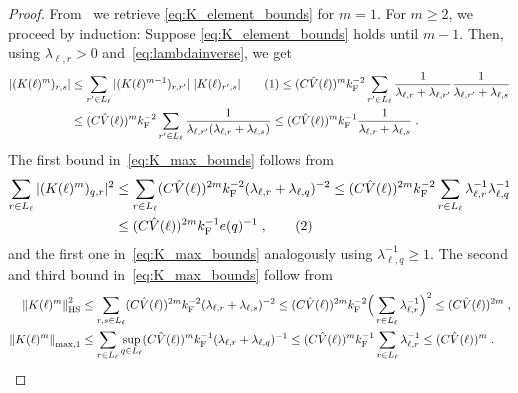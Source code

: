 \documentclass[12pt,a4paper]{article}
\numberwithin{equation}{section}
\newcommand{\1}{\mathbb{I}}
\newcommand{\F}{\mathrm{F}}
\newcommand{\HS}{\mathrm{HS}}
\newcommand{\tagg}[1]{ \stepcounter{equation} \tag{\theequation}
\label{#1} } %
\newcommand{\normmaxi}[1]{\norm{#1}_{\mathrm{max,1}}}
\theoremstyle{plain}
\theoremstyle{definition}
\theoremstyle{remark}
\theoremstyle{plain}
\theoremstyle{definition}
\theoremstyle{remark}
\begin{document}
\begin{proof}
From~\cite[Prop.~7.10]{CHN23} we retrieve \eqref{eq:K_element_bounds} for $ m = 1 $. For $ m \ge 2 $, we proceed by induction: Suppose \eqref{eq:K_element_bounds} holds until $ m-1 $. Then, using $ \lambda_{\ell,r} > 0 $ and~\eqref{eq:lambdainverse}, we get
\begin{align*}
		|(K(\ell)^m)_{r,s}|
		&\le \sum_{r' \in L_\ell}
		|(K(\ell)^{m-1})_{r,r'}| \;
		|K(\ell)_{r',s}| \tagg{eq:notimportant1}
		\le (C \hat{V}(\ell))^m k_{\F}^{-2} \sum_{r' \in L_\ell}
		\frac{1}{\lambda_{\ell, r} + \lambda_{\ell, r'}}
		\frac{1}{\lambda_{\ell, r'} + \lambda_{\ell, s}} \\
		&\le (C \hat{V}(\ell))^m k_{\F}^{-2} \sum_{r' \in L_\ell}
		\frac{1}{\lambda_{\ell, r'} (\lambda_{\ell, r} + \lambda_{\ell, s})}
		\le (C \hat{V}(\ell))^m k_{\F}^{-1}
		\frac{1}{\lambda_{\ell, r} + \lambda_{\ell, s}} \;.
\end{align*}
The first bound in~\eqref{eq:K_max_bounds} follows from
\begin{align*}
	\sum_{r \in L_\ell} |(K(\ell)^m)_{q,r}|^2
	&\le \sum_{r \in L_\ell} (C \hat{V}(\ell))^{2m} k_{\F}^{-2} (\lambda_{\ell,r} + \lambda_{\ell,q})^{-2}
	\le (C \hat{V}(\ell))^{2m} k_{\F}^{-2} \sum_{r \in L_\ell} \lambda_{\ell,r}^{-1} \lambda_{\ell,q}^{-1} \\
	&\le (C \hat{V}(\ell))^{2m} k_{\F}^{-1} e(q)^{-1} \;, \tagg{eq:notimportant}
\end{align*}
and the first one in~\eqref{eq:K_max_bounds} analogously using $ \lambda_{\ell,q}^{-1} \ge 1 $.
The second and third bound in~\eqref{eq:K_max_bounds} follow from
\begin{align}
	\norm{K(\ell)^m}_{\HS}^2
	&\le \sum_{r,s \in L_\ell} (C \hat{V}(\ell))^{2m} k_{\F}^{-2} (\lambda_{\ell,r} + \lambda_{\ell,s})^{-2} 
	\le (C \hat{V}(\ell))^{2m} k_{\F}^{-2} \Big( \sum_{r \in L_\ell} \lambda_{\ell,r}^{-1} \Big)^2
	\le (C \hat{V}(\ell))^{2m} \;, \nonumber\\
	\normmaxi{K(\ell)^m} 
	&\leq \sum_{r \in L_\ell} \sup_{q \in L_\ell} (C \hat{V}(\ell))^{m} k_{\F}^{-1} (\lambda_{\ell,r} + \lambda_{\ell,q})^{-1}
	\le (C \hat{V}(\ell))^{m} k_{\F}^{-1} \sum_{r \in L_\ell} \lambda_{\ell,r}^{-1} \leq (C \hat{V}(\ell))^{m} \;.\nonumber	\qedhere
\end{align}
\end{proof}
\end{document}
